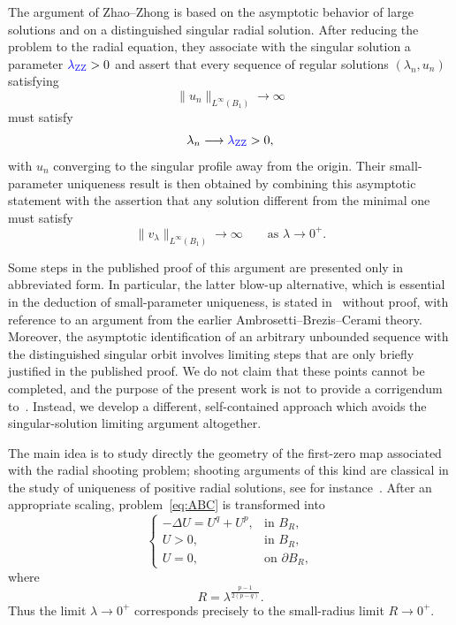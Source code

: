 \documentclass[11pt]{article}
\newcommand{\add}[1]{{\color{blue}#1}}
\newcommand{\lamZZ}{\add{\lambda_{\mathrm{ZZ}}}} %
\theoremstyle{definition}
\begin{document}
The argument of Zhao--Zhong is based on the asymptotic behavior of
large solutions and on a distinguished singular radial solution.
After reducing the problem to the radial equation, they associate
with the singular solution a parameter $\lamZZ>0$ and assert that
every sequence of regular solutions $(\lambda_n,u_n)$ satisfying
\[
\|u_n\|_{L^\infty(B_1)}\longrightarrow\infty
\]
must satisfy
\[
\lambda_n\longrightarrow\lamZZ>0,
\]
with $u_n$ converging to the singular profile away from the origin.
Their small-parameter uniqueness result is then obtained by combining
this asymptotic statement with the assertion that any solution
different from the minimal one must satisfy
\[
\|v_\lambda\|_{L^\infty(B_1)}
\longrightarrow\infty
\qquad\text{as }\lambda\to0^+.
\]

Some steps in the published proof of this argument are presented only
in abbreviated form. In particular, the latter blow-up alternative,
which is essential in the deduction of small-parameter uniqueness,
is stated in~\cite{ZhaoZhong2002} without proof, with reference to an
argument from the earlier Ambrosetti--Brezis--Cerami theory. Moreover,
the asymptotic identification of an arbitrary unbounded sequence with
the distinguished singular orbit involves limiting steps that are
only briefly justified in the published proof. We do not claim that
these points cannot be completed, and the purpose of the present work
is not to provide a corrigendum to~\cite{ZhaoZhong2002}. Instead, we
develop a different, self-contained approach which avoids the
singular-solution limiting argument altogether.

The main idea is to study directly the geometry of the first-zero map
associated with the radial shooting problem\add{; shooting arguments of
this kind are classical in the study of uniqueness of positive radial
solutions, see for instance~\cite{NiNussbaum}}. After an appropriate
scaling, problem~\eqref{eq:ABC} is transformed into
\begin{equation}
\label{eq:scaled-intro}
\begin{cases}
-\Delta U=U^q+U^p,
&\text{in }B_R,\\
U>0,
&\text{in }B_R,\\
U=0,
&\text{on }\partial B_R,
\end{cases}
\end{equation}
where
\begin{equation}
\label{eq:Rlambda-intro}
R=\lambda^{\frac{p-1}{2(p-q)}}.
\end{equation}
Thus the limit $\lambda\to0^+$ corresponds precisely to the
small-radius limit $R\to0^+$.
\end{document}
